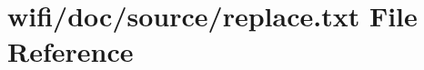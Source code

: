 \hypertarget{wifi_2doc_2source_2replace_8txt}{}\section{wifi/doc/source/replace.txt File Reference}
\label{wifi_2doc_2source_2replace_8txt}
